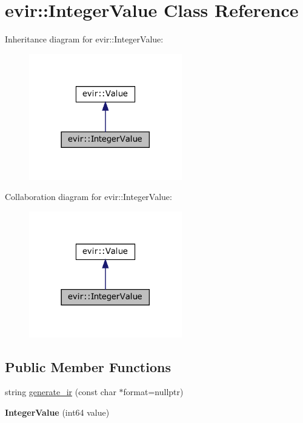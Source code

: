 \hypertarget{classevir_1_1IntegerValue}{}\section{evir\+:\+:Integer\+Value Class Reference}
\label{classevir_1_1IntegerValue}


Inheritance diagram for evir\+:\+:Integer\+Value\+:
\nopagebreak
\begin{figure}[H]
\begin{center}
\leavevmode
\includegraphics[width=189pt]{classevir_1_1IntegerValue__inherit__graph}
\end{center}
\end{figure}


Collaboration diagram for evir\+:\+:Integer\+Value\+:
\nopagebreak
\begin{figure}[H]
\begin{center}
\leavevmode
\includegraphics[width=189pt]{classevir_1_1IntegerValue__coll__graph}
\end{center}
\end{figure}
\subsection*{Public Member Functions}
\begin{DoxyCompactItemize}
\item 
string \hyperlink{classevir_1_1IntegerValue_a586411c365b2afc18fbd5960dd053d94}{generate\+\_\+ir} (const char $\ast$format=nullptr)
\item 
\mbox{\label{classevir_1_1IntegerValue_ad22144e1c972ad4c6afab52d75049afe}} 
{\bfseries Integer\+Value} (int64 value)
\end{DoxyCompactItemize}
